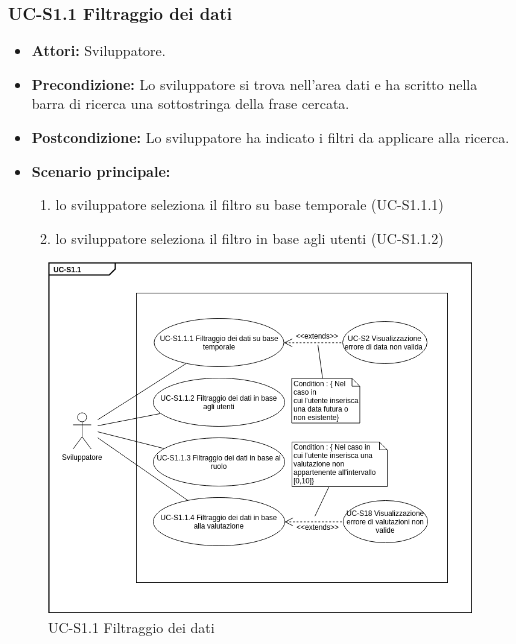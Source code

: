 	\subsubsection{UC-S1.1 Filtraggio dei dati}	
		\begin{itemize}
			\item \textbf{Attori:} Sviluppatore.
			\item \textbf{Precondizione:} Lo sviluppatore si trova nell'area dati e ha scritto nella barra di ricerca una sottostringa della frase cercata.
			\item \textbf{Postcondizione:} Lo sviluppatore ha indicato i filtri da applicare alla ricerca.
			\item \textbf{Scenario principale:}
				\begin{enumerate}
					\item lo sviluppatore seleziona il filtro su base temporale (UC-S1.1.1)
					\item lo sviluppatore seleziona il filtro in base agli utenti (UC-S1.1.2)
				\end{enumerate}
			\end{itemize}
	\begin{figure}[h]
			\centering
			\includegraphics[scale=0.7]{images/UC-S1_1.png}
			\caption{UC-S1.1 Filtraggio dei dati}
		\end{figure}	

